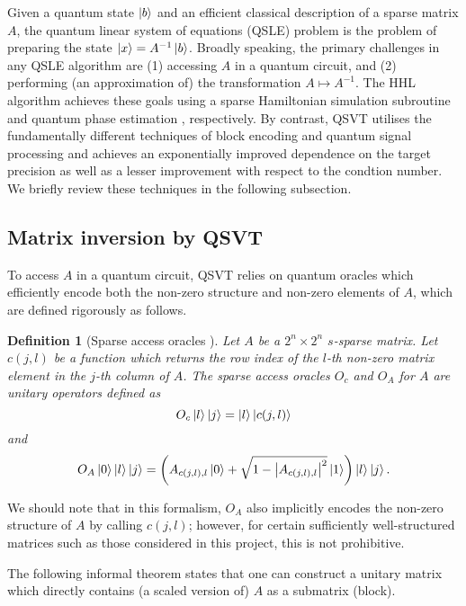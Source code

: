 \documentclass[10pt, twocolumn]{article}
\newtheorem{definition}[theorem]{Definition}
\begin{document}
Given a quantum state $\ket{b}$ and an efficient classical description of a sparse matrix $A$, the quantum linear system of equations (QSLE) problem is the problem of preparing the state $\ket{x} = A^{-1} \ket{b}$. Broadly speaking, the primary challenges in any QSLE algorithm are (1) accessing $A$ in a quantum circuit, and (2) performing (an approximation of) the transformation $A \mapsto A^{-1}$. The HHL algorithm \cite{harrow2009quantum} achieves these goals using a sparse Hamiltonian simulation subroutine \cite{berry2007efficient} and quantum phase estimation \cite{kitaev1995quantum}, respectively. By contrast, QSVT utilises the fundamentally different techniques of block encoding \cite{gilyen2019quantum} and quantum signal processing \cite{low2017optimal} and achieves an exponentially improved dependence on the target precision as well as a lesser improvement with respect to the condtion number. We briefly review these techniques in the following subsection.

\subsection{Matrix inversion by QSVT}

To access $A$ in a quantum circuit, QSVT relies on quantum oracles which efficiently encode both the non-zero structure and non-zero elements of $A$, which are defined rigorously as follows.

\begin{definition}[Sparse access oracles \cite{camps2203explicit}]
	\label{def::sparse_access_oracles}
	Let $A$ be a $2^n \times 2^n$ $s$-sparse matrix. Let $c(j,l)$ be a function which returns the row index of the $l$-th non-zero matrix element in the $j$-th column of $A$. The sparse access oracles $O_c$ and $O_A$ for $A$ are unitary operators defined as
	\[
		O_c \ket{l}\ket{j} = \ket{l}\ket{c(j, l)}
	\]
	and
	\[
		O_A \ket{0}\ket{l}\ket{j} = \left( A_{c(j, l), l} \ket{0} + \sqrt{1 - \abs{A_{c(j, l), l}}^2 } \ket{1} \right) \ket{l} \ket{j}.
	\]
\end{definition}

We should note that in this formalism, $O_A$ also implicitly encodes the non-zero structure of $A$ by calling $c(j, l)$; however, for certain sufficiently well-structured matrices such as those considered in this project, this is not prohibitive.

The following informal theorem states that one can construct a unitary matrix which directly contains (a scaled version of) $A$ as a submatrix (block).
\end{document}
